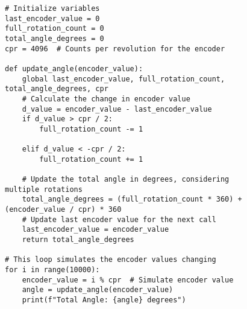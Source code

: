 \newpage



\begin{figure}[H]
	\centering
	\begin{verbatim}
# Initialize variables
last_encoder_value = 0
full_rotation_count = 0
total_angle_degrees = 0
cpr = 4096  # Counts per revolution for the encoder

def update_angle(encoder_value):
    global last_encoder_value, full_rotation_count, total_angle_degrees, cpr
    # Calculate the change in encoder value
    d_value = encoder_value - last_encoder_value
    if d_value > cpr / 2: 
        full_rotation_count -= 1

    elif d_value < -cpr / 2:
        full_rotation_count += 1

    # Update the total angle in degrees, considering multiple rotations
    total_angle_degrees = (full_rotation_count * 360) + (encoder_value / cpr) * 360
    # Update last encoder value for the next call
    last_encoder_value = encoder_value
    return total_angle_degrees

# This loop simulates the encoder values changing
for i in range(10000): 
    encoder_value = i % cpr  # Simulate encoder value
    angle = update_angle(encoder_value)
    print(f"Total Angle: {angle} degrees")
	\end{verbatim}

\end{figure}


\newpage
{}


